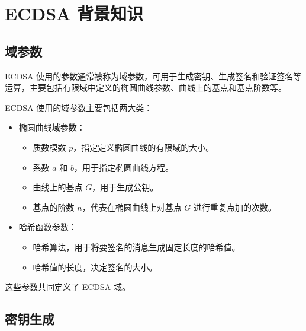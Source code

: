 \documentclass[main\_\_CN.tex]{subfiles}
\begin{document}

\label{sec:ecdsa-terminology}

\section{ECDSA 背景知识}
\subsection{域参数}

ECDSA 使用的参数通常被称为域参数，可用于生成密钥、生成签名和验证签名等运算，主要包括有限域中定义的椭圆曲线参数、曲线上的基点和基点阶数等。

ECDSA 使用的域参数主要包括两大类：

\begin{itemize}
    \item 椭圆曲线域参数：
          \begin{itemize}
              \item 质数模数 $p$，指定定义椭圆曲线的有限域的大小。
              \item 系数 $a$ 和 $b$，用于指定椭圆曲线方程。
              \item 曲线上的基点 $G$，用于生成公钥。
              \item 基点的阶数 $n$，代表在椭圆曲线上对基点 $G$ 进行重复点加的次数。
          \end{itemize}
    \item 哈希函数参数：
          \begin{itemize}
              \item 哈希算法，用于将要签名的消息生成固定长度的哈希值。
              \item 哈希值的长度，决定签名的大小。
          \end{itemize}
\end{itemize}

这些参数共同定义了 ECDSA 域。

\subsection{密钥生成}
\end{document}
